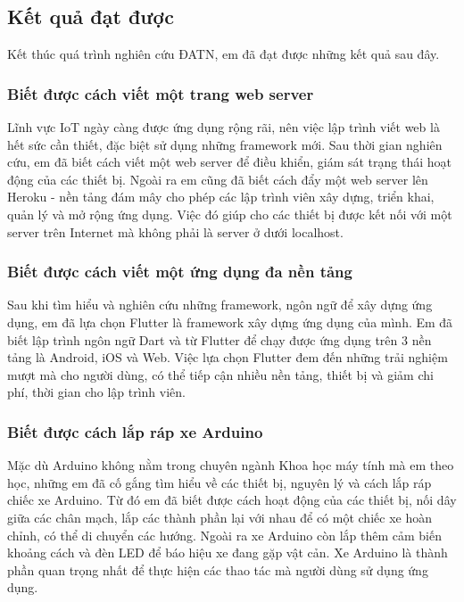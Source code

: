\documentclass[../DoAn.tex]{subfiles}
\begin{document}
\subsection{Kết quả đạt được}

Kết thúc quá trình nghiên cứu ĐATN, em đã đạt được những kết quả sau đây.

\subsubsection{Biết được cách viết một trang web server}

Lĩnh vực IoT ngày càng được ứng dụng rộng rãi, nên việc lập trình viết web là hết sức cần thiết, đặc biệt sử dụng những framework mới. Sau thời gian nghiên cứu, em đã biết cách viết một web server để điều khiển, giám sát trạng thái hoạt động của các thiết bị. Ngoài ra em cũng đã biết cách đẩy một web server lên Heroku - nền tảng đám mây cho phép các lập trình viên xây dựng, triển khai, quản lý và mở rộng ứng dụng. Việc đó giúp cho các thiết bị được kết nối với một server trên Internet mà không phải là server ở dưới localhost.

\subsubsection{Biết được cách viết một ứng dụng đa nền tảng}

Sau khi tìm hiểu và nghiên cứu những framework, ngôn ngữ để xây dựng ứng dụng, em đã lựa chọn Flutter là framework xây dựng ứng dụng của mình. Em đã biết lập trình ngôn ngữ Dart và từ Flutter để chạy được ứng dụng trên 3 nền tảng là Android, iOS và Web. Việc lựa chọn Flutter đem đến những trải nghiệm mượt mà cho người dùng, có thể tiếp cận nhiều nền tảng, thiết bị và giảm chi phí, thời gian cho lập trình viên.

\subsubsection{Biết được cách lắp ráp xe Arduino}

Mặc dù Arduino không nằm trong chuyên ngành Khoa học máy tính mà em theo học, những em đã cố gắng tìm hiểu về các thiết bị, nguyên lý và cách lắp ráp chiếc xe Arduino. Từ đó em đã biết được cách hoạt động của các thiết bị, nối dây giữa các chân mạch, lắp các thành phần lại với nhau để có một chiếc xe hoàn chỉnh, có thể di chuyển các hướng. Ngoài ra xe Arduino còn lắp thêm cảm biến khoảng cách và đèn LED để báo hiệu xe đang gặp vật cản. Xe Arduino là thành phần quan trọng nhất để thực hiện các thao tác mà người dùng sử dụng ứng dụng.
\end{document}
